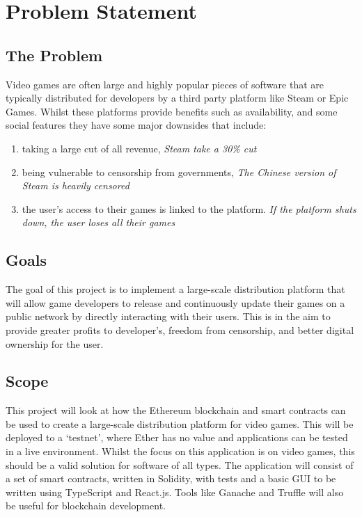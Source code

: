 
\chapter{Problem Statement}

\section{The Problem}
\label{sec:problem}

Video games are often large and highly popular pieces of software that are typically distributed for developers by a third party platform like Steam or Epic Games. Whilst these platforms provide benefits such as availability, and some social features they have some major downsides that include:
\vspace{1mm}
\begin{enumerate}[label=(\alph*)]
  \item taking a large cut of all revenue, \newline\textit{Steam take a 30\% cut~\cite{marks_report_2019,brown_valve_2021}}
  \item being vulnerable to censorship from governments, \newline\textit{The Chinese version of Steam is heavily censored~\cite{steamdb_steam_2021}}
  \item the user's access to their games is linked to the platform. \newline\textit{If the platform shuts down, the user loses all their games}
\end{enumerate}
\vspace{1mm}

\section{Goals}

The goal of this project is to implement a large-scale distribution platform that will allow game developers to release and continuously update their games on a public network by directly interacting with their users. This is in the aim to provide greater profits to developer's, freedom from censorship, and better digital ownership for the user.

\section{Scope}

This project will look at how the Ethereum blockchain and smart contracts can be used to create a large-scale distribution platform for video games. This will be deployed to a `testnet', where Ether has no value and applications can be tested in a live environment. Whilst the focus on this application is on video games, this should be a valid solution for software of all types.
\x
The application will consist of a set of smart contracts, written in Solidity, with tests and a basic GUI to be written using TypeScript and React.js. Tools like Ganache and Truffle will also be useful for blockchain development.